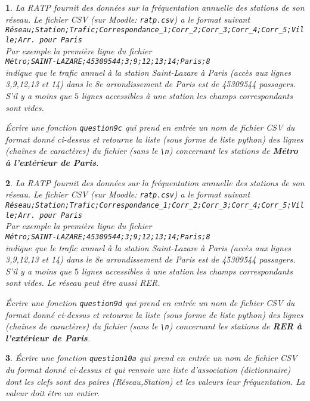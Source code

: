 \documentclass[10pt]{article}
\newtheorem{exi}{}
\newenvironment{exo}{\begin{exi}\em}{\end{exi}}
\begin{document}
\begin{exo}
    La RATP fournit des données sur la fréquentation annuelle des stations de son réseau. Le fichier CSV (sur Moodle: \verb+ratp.csv+) a le format suivant\\
\verb+Réseau;Station;Trafic;Correspondance_1;Corr_2;Corr_3;Corr_4;Corr_5;Ville;Arr. pour Paris+\\
Par exemple la première ligne du fichier\\
\verb+Métro;SAINT-LAZARE;45309544;3;9;12;13;14;Paris;8+\\
indique que le trafic annuel à la station Saint-Lazare à Paris (accès aux lignes 3,9,12,13 et 14) dans le 8e arrondissement de Paris est de 45309544 passagers. S'il y a moins que $5$ lignes accessibles à une station les champs correspondants sont vides. 

Écrire une fonction {\tt question9c} qui prend en entrée un nom de fichier CSV
du format donné ci-dessus
et retourne la liste (sous forme de liste python) des lignes (chaînes
de caractères) du fichier (sans le \verb+\n+)
concernant les stations de {\bf Métro à l'extérieur de Paris}.
\end{exo}
\vspace*{-2ex}
\begin{exo}
    La RATP fournit des données sur la fréquentation annuelle des stations de son
réseau. Le fichier CSV (sur Moodle: \verb+ratp.csv+) a le format suivant\\
\verb+Réseau;Station;Trafic;Correspondance_1;Corr_2;Corr_3;Corr_4;Corr_5;Ville;Arr. pour Paris+\\
Par exemple la première ligne du fichier\\
\verb+Métro;SAINT-LAZARE;45309544;3;9;12;13;14;Paris;8+\\
indique que le trafic annuel à la station Saint-Lazare à Paris (accès aux lignes 3,9,12,13 et 14) dans le 8e arrondissement de Paris est de 45309544 passagers.
S'il y a moins que $5$ lignes accessibles à une station les champs correspondants sont vides.  Le réseau peut être aussi RER.

Écrire une fonction {\tt question9d} qui prend en entrée un nom de fichier CSV
du format donné ci-dessus
et retourne la liste (sous forme de liste python) des lignes (chaînes
de caractères) du fichier (sans le \verb+\n+)
concernant les stations de {\bf RER à l'extérieur de Paris}.
\end{exo}
\vspace*{-2ex}
\begin{exo}
    Écrire une fonction {\tt question10a} qui prend en entrée un nom de fichier CSV
du format donné ci-dessus
et qui renvoie une liste d'association (dictionnaire) dont les clefs sont
des paires (Réseau,Station) et les valeurs leur fréquentation.
La valeur doit être un entier.
\end{exo}
\end{document}
